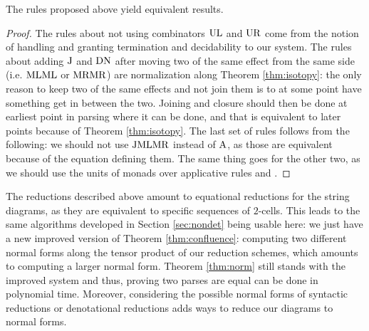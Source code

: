 \begin{theorem}
	The rules proposed above yield equivalent results.
\end{theorem}
\begin{proof}
	The rules about not using combinators $\text{UL}$ and $\text{UR}$ come from the
	notion of handling and granting termination and decidability to our system.
	The rules about adding $\text{J}$ and $\text{DN}$ after moving two of the same
	effect from the same side (i.e. $\text{ML} \text{ML}$ or $\text{MR}\text{MR}$) are
	normalization along Theorem \ref{thm:isotopy}: the only reason to keep two of
	the same effects and not join them is to at some point	have something get in
	between the two.
	Joining and closure should then be done at earliest point in parsing where it
	can be done, and that is equivalent to later points because of Theorem
	\ref{thm:isotopy}.
	The last set of rules follows from the following: we should not use $\text{J}
		\text{ML} \text{MR}$ instead of $\text{A}$, as those are equivalent because of the
	equation defining them.
	The same thing goes for the other two, as we should use the units of monads
	over applicative rules and \fmap.
\end{proof}

The reductions described above amount to equational reductions for the string
diagrams, as they are equivalent to specific sequences of $2$-cells.
This leads to the same algorithms developed in Section \ref{sec:nondet} being
usable here: we just have a new improved version of Theorem
\ref{thm:confluence}: computing two different normal forms along the
tensor product of our reduction schemes, which amounts to computing a larger
normal form.
Theorem \ref{thm:norm} still stands with the improved system and thus, proving
two parses are equal can be done in polynomial time.
Moreover, considering the possible normal forms of syntactic reductions
or denotational reductions adds ways to reduce our diagrams to normal forms.
